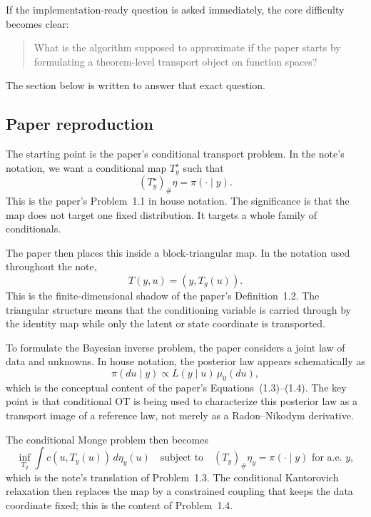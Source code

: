 \documentclass[11pt]{report}
\newcommand{\pushf}[2]{\left(#1\right)_{\#} #2}
\begin{document}
If the implementation-ready question is asked immediately, the core difficulty
becomes clear:
\begin{quote}
What is the algorithm supposed to approximate if the paper starts by formulating a
theorem-level transport object on function spaces?
\end{quote}
The section below is written to answer that exact question.

\subsection*{Paper reproduction}

The starting point is the paper's conditional transport problem.  In the note's
notation, we want a conditional map $T_y^\star$ such that
\begin{equation}
\pushf{T_y^\star}{\eta} = \pi(\cdot\mid y).
\label{eq:hosseini-pushforward}
\end{equation}
This is the paper's Problem~1.1 in house notation.  The significance is that the
map does not target one fixed distribution.  It targets a whole family of
conditionals.

The paper then places this inside a block-triangular map.  In the notation used
throughout the note,
\begin{equation}
T(y,u) = (y,T_y(u)).
\label{eq:hosseini-block-triangular}
\end{equation}
This is the finite-dimensional shadow of the paper's Definition~1.2.  The
triangular structure means that the conditioning variable is carried through by the
identity map while only the latent or state coordinate is transported.

To formulate the Bayesian inverse problem, the paper considers a joint law of data
and unknowns.  In house notation, the posterior law appears schematically as
\begin{equation}
\pi(du\mid y) \propto L(y\mid u)\,\mu_0(du),
\label{eq:hosseini-bip-posterior}
\end{equation}
which is the conceptual content of the paper's Equations~(1.3)--(1.4).  The key
point is that conditional OT is being used to characterize this posterior law as a
transport image of a reference law, not merely as a Radon--Nikodym derivative.

The conditional Monge problem then becomes
\begin{equation}
\inf_{T_y}
\int c(u,T_y(u))\,d\eta_y(u)
\quad\text{subject to}\quad
\pushf{T_y}{\eta_y} = \pi(\cdot\mid y)
\text{ for a.e. } y,
\label{eq:hosseini-conditional-monge}
\end{equation}
which is the note's translation of Problem~1.3.  The conditional Kantorovich
relaxation then replaces the map by a constrained coupling that keeps the data
coordinate fixed; this is the content of Problem~1.4.
\end{document}
